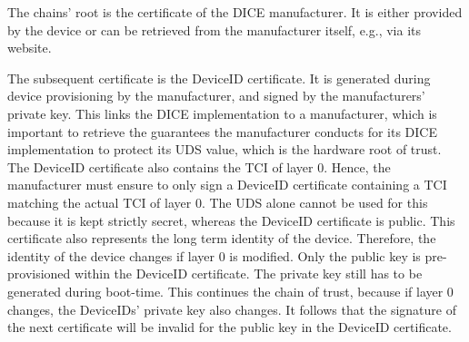 The chains' root is the certificate of the DICE manufacturer. It is either provided by the device or can be retrieved from the manufacturer itself, e.g., via its website.


The subsequent certificate is the DeviceID certificate.
It is generated during device provisioning by the manufacturer, and signed by the manufacturers' private key.
This links the DICE implementation to a manufacturer, which is important to retrieve the guarantees the manufacturer conducts for its DICE implementation to protect its UDS value, which is the hardware root of trust.
The DeviceID certificate also contains the TCI of layer 0.
Hence, the manufacturer must ensure to only sign a DeviceID certificate containing a TCI matching the actual TCI of layer 0.
The UDS alone cannot be used for this because it is kept strictly secret, whereas the DeviceID certificate is public.
This certificate also represents the long term identity of the device. Therefore, the identity of the device changes if layer 0 is modified.
Only the public key is pre-provisioned within the DeviceID certificate.
The private key still has to be generated during boot-time.
This continues the chain of trust, because if layer 0 changes, the DeviceIDs' private key also changes.
It follows that the signature of the next certificate will be invalid for the public key in the DeviceID certificate.




